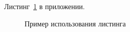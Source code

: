 
Листинг~\ref{src:src3} в приложении.

\begin{figure}

\caption{Пример использования листинга}
\label{src:src3}
\end{figure}